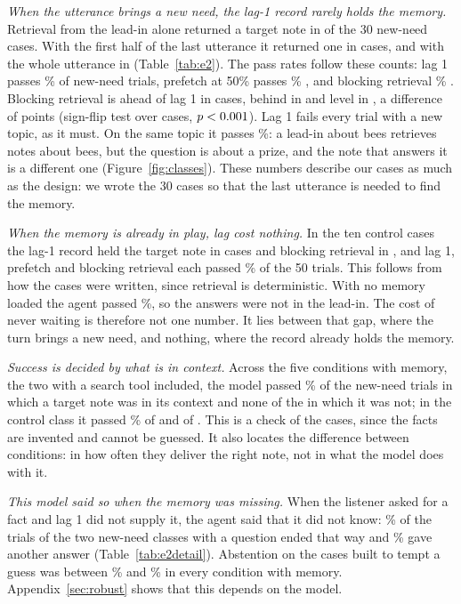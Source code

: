 \documentclass[10pt]{article}
\begin{document}
\emph{When the utterance brings a new need, the lag-1 record rarely holds the memory.} Retrieval from the lead-in alone returned a target note in \GoldCasesLag{} of the 30 new-need cases. With the first half of the last utterance it returned one in \GoldCasesPre{} cases, and with the whole utterance in \GoldCasesBlock{} (Table~\ref{tab:e2}). The pass rates follow these counts: lag 1 passes \RecLag\% \RecLagCI{} of new-need trials, prefetch at 50\% passes \RecPre\% \RecPreCI{}, and blocking retrieval \RecBlock\% \RecBlockCI{}. Blocking retrieval is ahead of lag 1 in \CaseAheadBlockLag{} cases, behind in \CaseBehindBlockLag{} and level in \CaseLevelBlockLag{}, a difference of \DiffBlockLag{} points \DiffBlockLagCI{} (sign-flip test over cases, $p < 0.001$). Lag 1 fails every trial with a new topic, as it must. On the same topic it passes \ContLag\%: a lead-in about bees retrieves notes about bees, but the question is about a prize, and the note that answers it is a different one (Figure~\ref{fig:classes}). These numbers describe our cases as much as the design: we wrote the 30 cases so that the last utterance is needed to find the memory.

\emph{When the memory is already in play, lag cost nothing.} In the ten control cases the lag-1 record held the target note in \CarryGoldCasesLag{} cases and blocking retrieval in \CarryGoldCasesBlock{}, and lag 1, prefetch and blocking retrieval each passed \CarryLag\% of the 50 trials. This follows from how the cases were written, since retrieval is deterministic. With no memory loaded the agent passed \CarryNone\%, so the answers were not in the lead-in. The cost of never waiting is therefore not one number. It lies between that gap, where the turn brings a new need, and nothing, where the record already holds the memory.

\emph{Success is decided by what is in context.} Across the five conditions with memory, the two with a search tool included, the model passed \PassGivenGold\% of the \PassGivenGoldN{} new-need trials in which a target note was in its context and none of the \PassGivenNoGoldN{} in which it was not; in the control class it passed \CarryPassGivenGold\% of \CarryPassGivenGoldN{} and \CarryNoGoldPassed{} of \CarryNoGoldN{}. This is a check of the cases, since the facts are invented and cannot be guessed. It also locates the difference between conditions: in how often they deliver the right note, not in what the model does with it.

\emph{This model said so when the memory was missing.} When the listener asked for a fact and lag 1 did not supply it, the agent said that it did not know: \DeclinedLag\% of the trials of the two new-need classes with a question ended that way and \OtherLag\% gave another answer (Table~\ref{tab:e2detail}). Abstention on the cases built to tempt a guess was between \AbstTool\% and \AbstPre\% in every condition with memory. Appendix~\ref{sec:robust} shows that this depends on the model.
\end{document}
